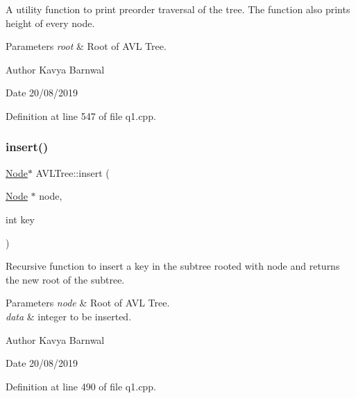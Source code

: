 A utility function to print preorder traversal of the tree. The function also prints height of every node. 
\begin{DoxyParams}{Parameters}
{\em root} & Root of A\+VL Tree. \\
\hline
\end{DoxyParams}
\begin{DoxyAuthor}{Author}
Kavya Barnwal 
\end{DoxyAuthor}
\begin{DoxyDate}{Date}
20/08/2019 
\end{DoxyDate}


Definition at line 547 of file q1.\+cpp.

\mbox{\label{class_a_v_l_tree_adab09466d7b80c7b10eade93fca1b831}} 
\subsubsection{\texorpdfstring{insert()}{insert()}}
{\footnotesize\ttfamily \hyperlink{class_node}{Node}$\ast$ A\+V\+L\+Tree\+::insert (\begin{DoxyParamCaption}\item[{\hyperlink{class_node}{Node} $\ast$}]{node,  }\item[{int}]{key }\end{DoxyParamCaption})\hspace{0.3cm}{\ttfamily [inline]}}

Recursive function to insert a key in the subtree rooted with node and returns the new root of the subtree. 
\begin{DoxyParams}{Parameters}
{\em node} & Root of A\+VL Tree. \\
\hline
{\em data} & integer to be inserted. \\
\hline
\end{DoxyParams}
\begin{DoxyAuthor}{Author}
Kavya Barnwal 
\end{DoxyAuthor}
\begin{DoxyDate}{Date}
20/08/2019 
\end{DoxyDate}


Definition at line 490 of file q1.\+cpp.

\mbox{\label{class_a_v_l_tree_a8dc98844f7c4301e071bbc7c062ba9b5}} 
